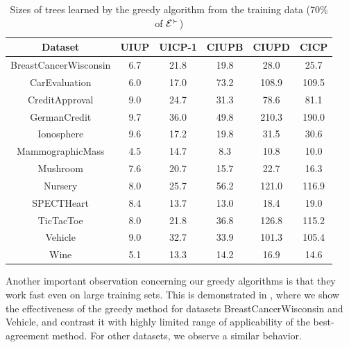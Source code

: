 \begin{table}
  \centering
  \small
  \caption{Sizes of trees learned by the greedy algorithm from the training 
					 data (70\% of $\mathcal{E}^\succ$)}
	\setlength\tabcolsep{6pt}
  \begin{tabular}{ |c||c|c|c|c|c| }
    \hline
    Dataset          & UIUP & UICP-1 & CIUPB & CIUPD  & CICP \\
    \hline \hline                                       
    BreastCancerWisconsin              & 6.7  & 21.8   & 19.8  & 28.0   & 25.7    \\ \hline
    CarEvaluation               & 6.0  & 17.0   & 73.2  & 108.9  & 109.5   \\ \hline
    CreditApproval               & 9.0  & 24.7   & 31.3  & 78.6   & 81.1    \\ \hline
    GermanCredit               & 9.7  & 36.0   & 49.8  & 210.3  & 190.0   \\ \hline
    Ionosphere               & 9.6  & 17.2   & 19.8  & 31.5   & 30.6    \\ \hline
    MammographicMass               & 4.5  & 14.7   & 8.3   & 10.8   & 10.0    \\ \hline
    Mushroom               & 7.6  & 20.7   & 15.7  & 22.7   & 16.3    \\ \hline
    Nursery               & 8.0  & 25.7   & 56.2  & 121.0  & 116.9   \\ \hline
    SPECTHeart               & 8.4  & 13.7   & 13.0  & 18.4   & 19.0    \\ \hline
    TicTacToe              & 8.0  & 21.8   & 36.8  & 126.8  & 115.2   \\ \hline
    Vehicle               & 9.0  & 32.7   & 33.9  & 101.3  & 105.4   \\ \hline
    Wine               & 5.1  & 13.3   & 14.2  & 16.9   & 14.6    \\ \hline
  \end{tabular}
  \label{tbl:trees_size}
\end{table}

Another important observation concerning our greedy algorithms is that
they work fast even on large training sets. This is demonstrated in 
, where we show the effectiveness of the greedy method
for datasets BreastCancerWisconsin and Vehicle, and contrast it with highly limited range of
applicability of the best-agreement method. For other datasets, we observe 
a similar behavior.

